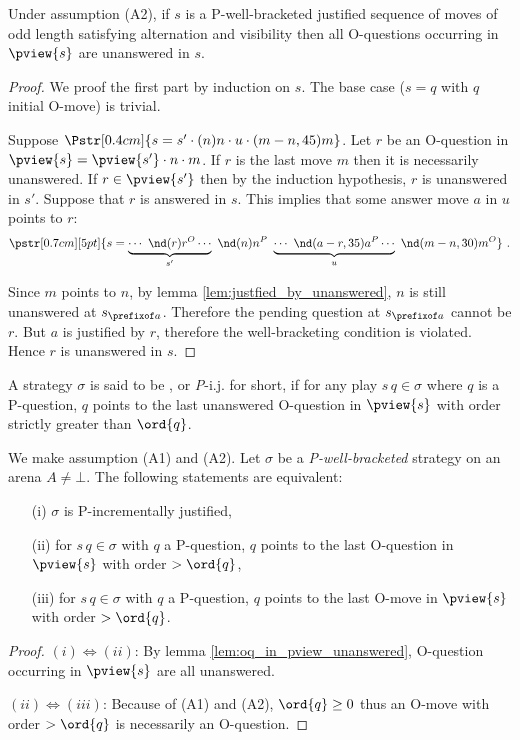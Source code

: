 \begin{lemma}
\label{lem:oq_in_pview_unanswered}
Under assumption (A2), if $s$ is a P-well-bracketed justified sequence of moves of odd length satisfying alternation and visibility then  all O-questions occurring in $\pview{s}$ are unanswered in $s$.
\end{lemma}
\begin{proof}
We proof the first part by induction on $s$.
The base case ($s = q$ with $q$ initial O-move) is trivial.

Suppose $\Pstr[0.4cm]{ s = s' \cdot (n)n \cdot u \cdot (m-n,45){m} }$.
Let $r$ be an O-question in $\pview{s} = \pview{s'} \cdot n \cdot m$.
If $r$ is the last move $m$ then it is necessarily unanswered.
If $r \in \pview{s'}$ then by the induction hypothesis, $r$ is unanswered in $s'$.
Suppose that $r$ is answered in $s$. This implies that some answer move $a$ in $u$ points to $r$:
$$\pstr[0.7cm][5pt]{ s = \underbrace{\cdots\ \nd(r){r}^O \cdots }_{s'} \
\nd(n){n}^P \ \underbrace{\cdots\ \nd(a-r,35){a}^P \cdots }_{u} \
\nd(m-n,30){m}^O } \ .$$
 
Since $m$ points to $n$, by lemma \ref{lem:justfied_by_unanswered}, $n$ is still unanswered at $s_{\prefixof a}$. Therefore the pending
question at $s_{\prefixof a}$ cannot be $r$. But $a$ is justified by $r$, therefore the well-bracketing condition is violated. Hence $r$ is
unanswered in $s$.
\end{proof}





\begin{definition}\rm
  A strategy $\sigma$ is said to be \defname{P-incrementally
    justified}, or {\emph P-i.j.} for short, if for any play $s \, q \in \sigma$ where $q$ is a
  P-question, $q$ points to the last unanswered O-question in $\pview{s}$ with
  order strictly greater than $\ord{q}$.
\end{definition}

\begin{proposition}
\label{prop:char_pincr}
\rm We make assumption (A1) and (A2).
Let $\sigma$ be a \emph{P-well-bracketed} strategy on an arena $A\neq \bot$.
The following statements are equivalent:
\begin{enumerate}
\item[(i)] $\sigma$ is P-incrementally justified,
\item[(ii)] for $s \, q \in \sigma$ with $q$ a P-question, $q$ points to the last O-question in $\pview{s}$ with order $>\ord{q}$,
\item[(iii)] for $s \, q \in \sigma$ with $q$ a P-question, $q$ points to the last O-move in $\pview{s}$ with order $>\ord{q}$.
\end{enumerate}
\end{proposition}
\begin{proof}
$(i)\iff(ii)$: By lemma \ref{lem:oq_in_pview_unanswered}, O-question occurring in $\pview{s}$ are all unanswered.

$(ii)\iff(iii)$: Because of (A1) and (A2), $\ord{q} \geq 0$ thus an O-move with order $>\ord{q}$ is necessarily an O-question.
\end{proof}

